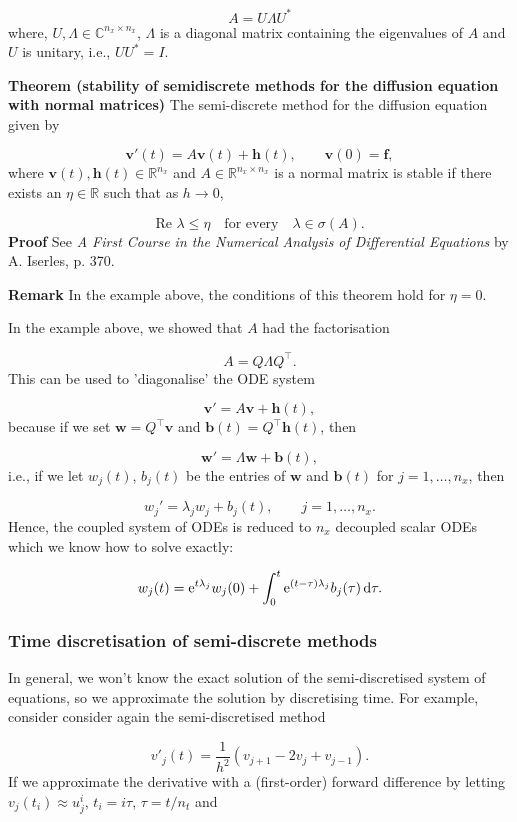\documentclass[12pt,landscape]{article}
\begin{document}
{\[
A = U \Lambda U^*
\]
where, $U, \Lambda \in \mathbb{C}^{n_x \times n_x}$, $\Lambda$ is a diagonal matrix containing the eigenvalues of $A$ and $U$ is unitary, i.e., $UU^* = I$.

\textbf{Theorem (stability of semidiscrete methods for the diffusion equation with normal matrices)} The semi-discrete method for the diffusion equation given by  

\[
\mathbf{v}'(t) = A\mathbf{v}(t) + \mathbf{h}(t), \qquad \mathbf{v}(0) = \mathbf{f}, 
\]
where $\mathbf{v}(t), \mathbf{h}(t) \in \mathbb{R}^{n_x}$ and  $A \in \mathbb{R}^{n_x \times n_x}$ is a normal matrix is stable if there exists an $\eta \in \mathbb{R}$ such that as $h \to 0$,

\[
\text{Re } \lambda \leq \eta \quad \text{for every} \quad \lambda \in \sigma(A).
\]
\textbf{Proof}  See \emph{A First Course in the Numerical Analysis of Differential Equations} by A. Iserles, p. 370.

\textbf{Remark} In the example above, the conditions of this theorem hold for $\eta = 0$.

In the example above, we showed that $A$ had the factorisation

\[
A = Q\Lambda Q^{\top}.
\]
This can be used to 'diagonalise' the ODE system

\[
\mathbf{v}' = A\mathbf{v} + \mathbf{h}(t),
\]
because if we set $\mathbf{w} = Q^{\top}\mathbf{v}$ and $\mathbf{b}(t) = Q^{\top}\mathbf{h}(t)$, then

\[
\mathbf{w}' = \Lambda \mathbf{w} + \mathbf{b}(t), 
\]
i.e., if we let $w_j(t)$, $b_j(t)$ be the entries of $\mathbf{w}$ and $\mathbf{b}(t)$ for $j = 1, \ldots, n_x$, then

\[
w_j' = \lambda_j w_j + b_j(t), \qquad j = 1, \ldots, n_x.
\]
Hence, the coupled system of ODEs is reduced to $n_x$ decoupled scalar ODEs which we know how to solve exactly:

\[
w_j(t) = {\rm e}^{t\lambda_j}w_j(0) + \int_0^t {\rm e}^{(t - \tau)\lambda_j}b_j(\tau)\,{\rm d}\tau.
\]
\subsubsection{Time discretisation of semi-discrete methods}
In general, we won't know the exact solution of the semi-discretised system of equations, so we approximate the solution by discretising time.  For example, consider consider again the semi-discretised method 

\[
v'_j(t) = \frac{1}{h^2}\left(v_{j+1} - 2v_j + v_{j-1}   \right).
\]
If we approximate the derivative with a (first-order) forward difference by letting $v_j(t_i) \approx u^i_j$, $t_i = i\tau$, $\tau = t/n_t$ and 

}
\end{document}
